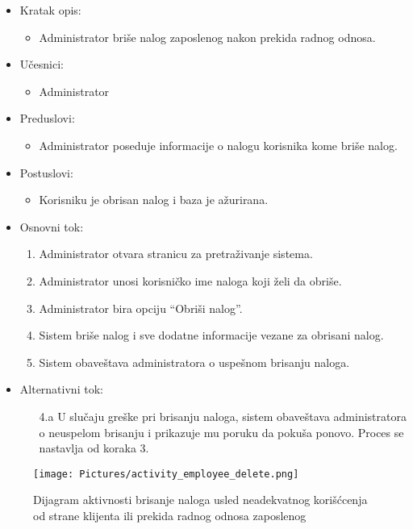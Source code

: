 
\begin{itemize}
    \item Kratak opis:
        \begin{itemize}
            \item Administrator briše nalog zaposlenog nakon prekida radnog odnosa.
        \end{itemize}
    \item Učesnici:
        \begin{itemize}
            \item Administrator
        \end{itemize}
    \item Preduslovi:
        \begin{itemize}
            \item Administrator poseduje informacije o nalogu korisnika kome briše nalog.
        \end{itemize}
    \item Postuslovi:
        \begin{itemize}
            \item Korisniku je obrisan nalog i baza je ažurirana.
        \end{itemize}
    \item Osnovni tok:
        \begin{enumerate}
         \item Administrator otvara stranicu za pretraživanje sistema.
         \item Administrator unosi korisničko ime naloga koji želi da obriše.
         \item Administrator bira opciju ``Obriši nalog''.
         \item Sistem briše nalog i sve dodatne informacije vezane za obrisani nalog.
         \item Sistem obaveštava administratora o uspešnom brisanju naloga.
        \end{enumerate}
    \item Alternativni tok:
        \begin{itemize}
            \item[4.a] U slučaju greške pri brisanju naloga, sistem obaveštava administratora o neuspelom brisanju i prikazuje mu poruku da pokuša ponovo. Proces se nastavlja od koraka 3.
        \end{itemize}
\end{itemize}

\begin{figure}[H]
\begin{center}
\texttt{[image: Pictures/activity\_employee\_delete.png]}
\end{center}
    \caption{Dijagram aktivnosti brisanje naloga usled neadekvatnog korišćcenja od strane klijenta ili prekida radnog odnosa zaposlenog}
\label{fig:ActivityDeleteEmployeeAccount}
\end{figure}
